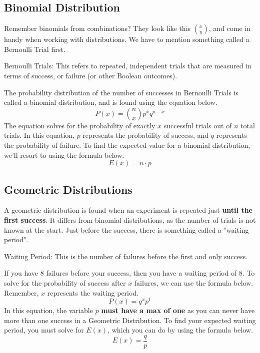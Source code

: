     \subsection{Binomial Distribution}
    Remember binomials from combinations? They look like this $\binom{x}{y}$, and come in handy when working with distributions.
    We have to mention something called a Bernoulli Trial first.
    \begin{definition}
        Bernoulli Trials: This refers to repeated, independent trials that are measured in terms of success, or failure (or other Boolean outcomes).
    \end{definition}
    The probability distribution of the number of successes in Bernoulli Trials is called a binomial distribution, and is found using the equation below.
    \begin{equation*}
        P(x) = \binom{n}{x}p^{x}q^{n-x}
    \end{equation*}
    The equation solves for the probability of exactly $x$ successful trials out of $n$ total trials. In this equation, $p$ represents the probability of success, and $q$ represents the probability of failure.
    To find the expected value for a binomial distribution, we'll resort to using the formula below.
    \begin{equation*}
        E(x) = n\cdot p
    \end{equation*}

    \subsection{Geometric Distributions}
    A geometric distribution is found when an experiment is repeated just \textbf{until the first success}.
    It differs from binomial distributions, as the number of trials is not known at the start. 
    Just before the success, there is something called a "waiting period". 
    \begin{definition}
        Waiting Period: This is the number of failures before the first and only success. 
    \end{definition}
    If you have 8 failures before your success, then you have a waiting period of 8.
    To solve for the probability of success after $x$ failures, we can use the formula below.
    Remember, $x$ represents the waiting period.
    \begin{equation*}
        P(x) = q^{x}p^{1}
    \end{equation*}
    In this equation, the variable $p$ \textbf{must have a max of one} as you can never have more than one success in a Geometric Distribution. To find your expected waiting period, you must solve for $E(x)$, which you can do by using the formula below.
    \begin{equation*}
        E(x) = \frac{q}{p}
    \end{equation*}
